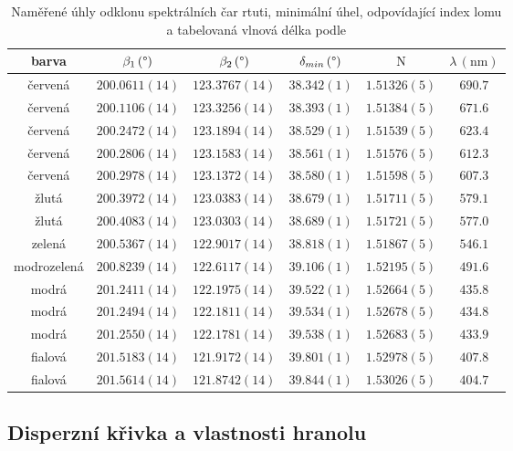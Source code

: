 \documentclass{../concepts/titul_protokol_p/prepareprotokol} %
\begin{document}
\begin{table}[!htbp]
\centering
\caption{Naměřené úhly odklonu spektrálních čar rtuti, 
minimální úhel, odpovídající index lomu a tabelovaná vlnová délka
podle \cite{tabulka}}
\begin{tabular}{cccccc}
 \toprule
 barva & $\beta_1\, (\mathrm{\degree})$ & $\beta_2\, (\mathrm{\degree})$ & $\delta_{min}\, (\mathrm{\degree})$ & $\mathrm{N}$ & $\lambda\, (\mathrm{nm})$ \\
 \midrule
 červená & $200.0611(14)$ & $123.3767(14)$ & $38.342(1)$ & $1.51326(5)$ & $690.7$ \\
 červená & $200.1106(14)$ & $123.3256(14)$ & $38.393(1)$ & $1.51384(5)$ & $671.6$ \\
 červená & $200.2472(14)$ & $123.1894(14)$ & $38.529(1)$ & $1.51539(5)$ & $623.4$ \\
 červená & $200.2806(14)$ & $123.1583(14)$ & $38.561(1)$ & $1.51576(5)$ & $612.3$ \\
 červená & $200.2978(14)$ & $123.1372(14)$ & $38.580(1)$ & $1.51598(5)$ & $607.3$ \\
 žlutá & $200.3972(14)$ & $123.0383(14)$ & $38.679(1)$ & $1.51711(5)$ & $579.1$ \\
 žlutá & $200.4083(14)$ & $123.0303(14)$ & $38.689(1)$ & $1.51721(5)$ & $577.0$ \\
 zelená & $200.5367(14)$ & $122.9017(14)$ & $38.818(1)$ & $1.51867(5)$ & $546.1$ \\
 modrozelená & $200.8239(14)$ & $122.6117(14)$ & $39.106(1)$ & $1.52195(5)$ & $491.6$ \\
 modrá & $201.2411(14)$ & $122.1975(14)$ & $39.522(1)$ & $1.52664(5)$ & $435.8$ \\
 modrá & $201.2494(14)$ & $122.1811(14)$ & $39.534(1)$ & $1.52678(5)$ & $434.8$ \\
 modrá & $201.2550(14)$ & $122.1781(14)$ & $39.538(1)$ & $1.52683(5)$ & $433.9$ \\
 fialová & $201.5183(14)$ & $121.9172(14)$ & $39.801(1)$ & $1.52978(5)$ & $407.8$ \\
 fialová & $201.5614(14)$ & $121.8742(14)$ & $39.844(1)$ & $1.53026(5)$ & $404.7$ \\
 \bottomrule
\end{tabular}
\label{tab:rtut}
\end{table}

\subsection{Disperzní křivka a vlastnosti hranolu}
\end{document}
